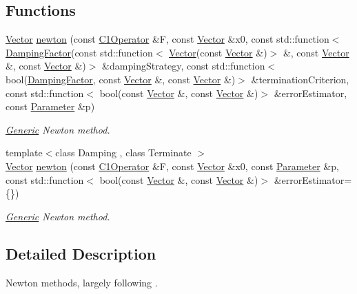 \subsection*{\-Functions}
\begin{DoxyCompactItemize}
\item 
\hyperlink{classSpacy_1_1Vector}{\-Vector} \hyperlink{namespaceSpacy_1_1Newton_a3f15c7f2f703c971382e2a3f17fd5391}{newton} (const \hyperlink{classSpacy_1_1C1Operator}{\-C1\-Operator} \&\-F, const \hyperlink{classSpacy_1_1Vector}{\-Vector} \&x0, const std\-::function$<$ \hyperlink{classSpacy_1_1DampingFactor}{\-Damping\-Factor}(const std\-::function$<$ \hyperlink{classSpacy_1_1Vector}{\-Vector}(const \hyperlink{classSpacy_1_1Vector}{\-Vector} \&)$>$ \&, const \hyperlink{classSpacy_1_1Vector}{\-Vector} \&, const \hyperlink{classSpacy_1_1Vector}{\-Vector} \&)$>$ \&damping\-Strategy, const std\-::function$<$ bool(\hyperlink{classSpacy_1_1DampingFactor}{\-Damping\-Factor}, const \hyperlink{classSpacy_1_1Vector}{\-Vector} \&, const \hyperlink{classSpacy_1_1Vector}{\-Vector} \&)$>$ \&termination\-Criterion, const std\-::function$<$ bool(const \hyperlink{classSpacy_1_1Vector}{\-Vector} \&, const \hyperlink{classSpacy_1_1Vector}{\-Vector} \&)$>$ \&error\-Estimator, const \hyperlink{structSpacy_1_1Newton_1_1Parameter}{\-Parameter} \&p)
\begin{DoxyCompactList}\small\item\em \hyperlink{namespaceSpacy_1_1Generic}{\-Generic} \-Newton method. \end{DoxyCompactList}\item 
{\footnotesize template$<$class Damping , class Terminate $>$ }\\\hyperlink{classSpacy_1_1Vector}{\-Vector} \hyperlink{namespaceSpacy_1_1Newton_ae58104a160c7335748a9b800b2317c6d}{newton} (const \hyperlink{classSpacy_1_1C1Operator}{\-C1\-Operator} \&\-F, const \hyperlink{classSpacy_1_1Vector}{\-Vector} \&x0, const \hyperlink{structSpacy_1_1Newton_1_1Parameter}{\-Parameter} \&p, const std\-::function$<$ bool(const \hyperlink{classSpacy_1_1Vector}{\-Vector} \&, const \hyperlink{classSpacy_1_1Vector}{\-Vector} \&)$>$ \&error\-Estimator=\{\})
\begin{DoxyCompactList}\small\item\em \hyperlink{namespaceSpacy_1_1Generic}{\-Generic} \-Newton method. \end{DoxyCompactList}\end{DoxyCompactItemize}


\subsection{\-Detailed \-Description}
\-Newton methods, largely following \cite{Deuflhard2004}.

